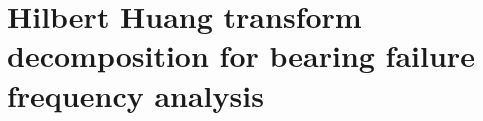 \documentclass[thesis.tex]{subfiles}
\begin{document}
\chapter[Hilbert Huang transform decomposition for bearing failure frequency analysis]{Hilbert Huang transform decomposition for bearing failure frequency analysis}
\label{sec:hht}
\end{document}

